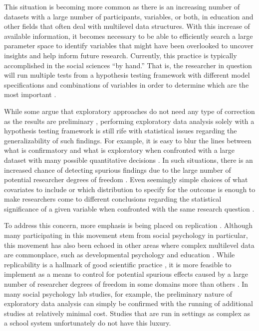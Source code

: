 This situation is becoming more common as there is an increasing number of datasets with a large number of participants, variables, or both, in education and other fields that often deal with multilevel data structures. With this increase of available information, it becomes necessary to be able to efficiently search a large parameter space to identify variables that might have been overlooked to uncover insights and help inform future research. Currently, this practice is typically accomplished in the social sciences ``by hand.'' That is, the researcher in question will run multiple tests from a hypothesis testing framework with different model specifications and combinations of variables in order to determine which are the most important \cite{strobl2009introduction}.


While some argue that exploratory approaches do not need any type of correction as the results are preliminary \cite{schochet2008technical}, performing exploratory data analysis solely with a hypothesis testing framework is still rife with statistical issues regarding the generalizability of such findings. For example, it is easy to blur the lines between what is confirmatory and what is exploratory when confronted with a large dataset with many possible quantitative decisions \cite{wagenmakers2012agenda}. In such situations, there is an increased chance of detecting spurious findings due to the large number of potential researcher degrees of freedom \cite{gelman2014statistical, ioannidis2005most, simmons2011false}. Even seemingly simple choices of what covariates to include or which distribution to specify for the outcome is enough to make researchers come to different conclusions regarding the statistical significance of a given variable when confronted with the same research question \cite{silberzahn2014}.


To address this concern, more emphasis is being placed on replication \cite{osc2014, oscinpress}. Although many participating in this movement stem from social psychology in particular, this movement has also been echoed in other areas where complex multilevel data are commonplace, such as developmental psychology \cite{duncan2014} and education \cite{makel2014facts}. While replicability is a hallmark of good scientific practice \cite{nosek2012scientific}, it is more feasible to implement as a means to control for potential spurious effects caused by a large number of researcher degrees of freedom in some domains more than others \cite{finkelinpress}. In many social psychology lab studies, for example, the preliminary nature of exploratory data analysis can simply be confirmed with the running of additional studies at relatively minimal cost. Studies that are run in settings as complex as a school system unfortunately do not have this luxury. 



